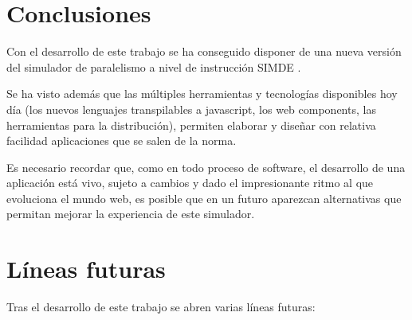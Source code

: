 \section{Conclusiones}
\label{7:sec1}

Con el desarrollo de este trabajo se ha conseguido disponer de una nueva versión
del simulador de paralelismo a nivel de instrucción SIMDE \cite{NuevaURLSimde}. 

\bigskip
Se ha visto además que las múltiples herramientas y tecnologías disponibles hoy
día (los nuevos lenguajes transpilables a javascript, los web components, las 
herramientas para la distribución), permiten elaborar y diseñar con relativa
facilidad aplicaciones que se salen de la norma.

\bigskip
Es necesario recordar que, como en todo proceso de software, el desarrollo de una 
aplicación está vivo, sujeto a cambios y dado el impresionante ritmo al que evoluciona
el mundo web, es posible que en un futuro aparezcan alternativas que permitan mejorar 
la experiencia de este simulador.

\section{Líneas futuras}
\label{7:sec2}

Tras el desarrollo de este trabajo se abren varias líneas futuras: 

